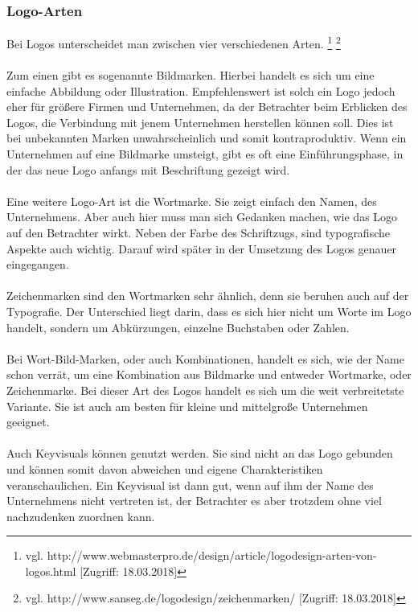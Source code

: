 \subsubsection{Logo-Arten}
Bei Logos unterscheidet man zwischen vier verschiedenen Arten. \footnote{\label{} vgl. http://www.webmasterpro.de/design/article/logodesign-arten-von-logos.html [Zugriff: 18.03.2018]} \footnote{\label{} vgl. http://www.sanseg.de/logodesign/zeichenmarken/ [Zugriff: 18.03.2018]}
\\
\\
Zum einen gibt es sogenannte Bildmarken. Hierbei handelt es sich um eine einfache Abbildung oder Illustration. Empfehlenswert ist solch ein Logo jedoch eher für größere Firmen und Unternehmen, da der Betrachter beim Erblicken des Logos, die Verbindung mit jenem Unternehmen herstellen können soll. Dies ist bei unbekannten Marken unwahrscheinlich und somit kontraproduktiv. Wenn ein Unternehmen auf eine Bildmarke umsteigt, gibt es oft eine Einführungsphase, in der das neue Logo anfangs mit Beschriftung gezeigt wird.
\\
\\
Eine weitere Logo-Art ist die Wortmarke. Sie zeigt einfach den Namen, des Unternehmens. Aber auch hier muss man sich Gedanken machen, wie das Logo auf den Betrachter wirkt. Neben der Farbe des Schriftzugs, sind typografische Aspekte auch wichtig. Darauf wird später in der Umsetzung des Logos genauer eingegangen.
\\
\\
Zeichenmarken sind den Wortmarken sehr ähnlich, denn sie beruhen auch auf der Typografie. Der Unterschied liegt darin, dass es sich hier nicht um Worte im Logo handelt, sondern um Abkürzungen, einzelne Buchstaben oder Zahlen.
\\
\\
Bei Wort-Bild-Marken, oder auch Kombinationen, handelt es sich, wie der Name schon verrät, um eine Kombination aus Bildmarke und entweder Wortmarke, oder Zeichenmarke. Bei dieser Art des Logos handelt es sich um die weit verbreitetste Variante. Sie ist auch am besten für kleine und mittelgroße Unternehmen geeignet.
\\
\\
Auch Keyvisuals können genutzt werden. Sie sind nicht an das Logo gebunden und können somit davon abweichen und eigene Charakteristiken veranschaulichen. Ein Keyvisual ist dann gut, wenn auf ihm der Name des Unternehmens nicht vertreten ist, der Betrachter es aber trotzdem ohne viel nachzudenken zuordnen kann.

